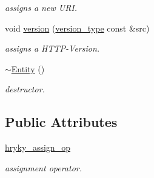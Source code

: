 \begin{DoxyCompactItemize}
\begin{DoxyCompactList}\small\item\em assigns a new U\-R\-I. \end{DoxyCompactList}\item 
\hypertarget{classhryky_1_1http_1_1request_1_1_entity_a60d82a3772c0e9fb9d96ef60c7f22428}{void \hyperlink{classhryky_1_1http_1_1request_1_1_entity_a60d82a3772c0e9fb9d96ef60c7f22428}{version} (\hyperlink{classhryky_1_1http_1_1version_1_1_entity}{version\-\_\-type} const \&src)}\label{classhryky_1_1http_1_1request_1_1_entity_a60d82a3772c0e9fb9d96ef60c7f22428}

\begin{DoxyCompactList}\small\item\em assigns a H\-T\-T\-P-\/\-Version. \end{DoxyCompactList}\item 
\hypertarget{classhryky_1_1http_1_1request_1_1_entity_a744af0e6f1f5b8ce1c8a95bbca3b9c80}{\hyperlink{classhryky_1_1http_1_1request_1_1_entity_a744af0e6f1f5b8ce1c8a95bbca3b9c80}{$\sim$\-Entity} ()}\label{classhryky_1_1http_1_1request_1_1_entity_a744af0e6f1f5b8ce1c8a95bbca3b9c80}

\begin{DoxyCompactList}\small\item\em destructor. \end{DoxyCompactList}\end{DoxyCompactItemize}
\subsection*{Public Attributes}
\begin{DoxyCompactItemize}
\item 
\hypertarget{classhryky_1_1http_1_1request_1_1_entity_a2b2ee715e07689a7181e119defcf60ab}{\hyperlink{classhryky_1_1http_1_1request_1_1_entity_a2b2ee715e07689a7181e119defcf60ab}{hryky\-\_\-assign\-\_\-op}}\label{classhryky_1_1http_1_1request_1_1_entity_a2b2ee715e07689a7181e119defcf60ab}

\begin{DoxyCompactList}\small\item\em assignment operator. \end{DoxyCompactList}\end{DoxyCompactItemize}

